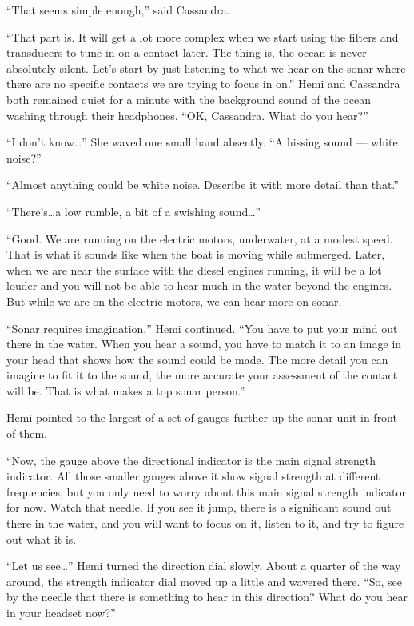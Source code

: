 \documentclass[
]{scrbook}
\begin{document}
``That seems simple enough,'' said Cassandra.

``That part is. It will get a lot more complex when we start using the
filters and transducers to tune in on a contact later. The thing is, the
ocean is never absolutely silent. Let's start by just listening to what
we hear on the sonar where there are no specific contacts we are trying
to focus in on.'' Hemi and Cassandra both remained quiet for a minute
with the background sound of the ocean washing through their headphones.
``OK, Cassandra. What do you hear?''

``I don't know\ldots{}'' She waved one small hand absently. ``A hissing
sound --- white noise?''

``Almost anything could be white noise. Describe it with more detail
than that.''

``There's\ldots a low rumble, a bit of a swishing sound\ldots{}''

``Good. We are running on the electric motors, underwater, at a modest
speed. That is what it sounds like when the boat is moving while
submerged. Later, when we are near the surface with the diesel engines
running, it will be a lot louder and you will not be able to hear much
in the water beyond the engines. But while we are on the electric
motors, we can hear more on sonar.

``Sonar requires imagination,'' Hemi continued. ``You have to put your
mind out there in the water. When you hear a sound, you have to match it
to an image in your head that shows how the sound could be made. The
more detail you can imagine to fit it to the sound, the more accurate
your assessment of the contact will be. That is what makes a top sonar
person.''

Hemi pointed to the largest of a set of gauges further up the sonar unit
in front of them.

``Now, the gauge above the directional indicator is the main signal
strength indicator. All those smaller gauges above it show signal
strength at different frequencies, but you only need to worry about this
main signal strength indicator for now. Watch that needle. If you see it
jump, there is a significant sound out there in the water, and you will
want to focus on it, listen to it, and try to figure out what it is.

``Let us see\ldots{}'' Hemi turned the direction dial slowly. About a
quarter of the way around, the strength indicator dial moved up a little
and wavered there. ``So, see by the needle that there is something to
hear in this direction? What do you hear in your headset now?''
\end{document}
